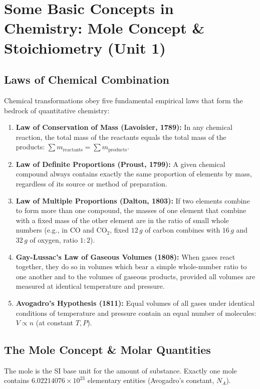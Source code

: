 \documentclass[10pt,a4paper]{article}
\begin{document}
\section{Some Basic Concepts in Chemistry: Mole Concept \& Stoichiometry (Unit 1)}

\subsection{Laws of Chemical Combination}
Chemical transformations obey five fundamental empirical laws that form the bedrock of quantitative chemistry:
\begin{enumerate}
  \item \textbf{Law of Conservation of Mass (Lavoisier, 1789):} In any chemical reaction, the total mass of the reactants equals the total mass of the products: $\sum m_{\text{reactants}} = \sum m_{\text{products}}$.
  \item \textbf{Law of Definite Proportions (Proust, 1799):} A given chemical compound always contains exactly the same proportion of elements by mass, regardless of its source or method of preparation.
  \item \textbf{Law of Multiple Proportions (Dalton, 1803):} If two elements combine to form more than one compound, the masses of one element that combine with a fixed mass of the other element are in the ratio of small whole numbers (e.g., in $\mathrm{CO}$ and $\mathrm{CO_2}$, fixed $12\,\si{g}$ of carbon combines with $16\,\si{g}$ and $32\,\si{g}$ of oxygen, ratio $1:2$).
  \item \textbf{Gay-Lussac's Law of Gaseous Volumes (1808):} When gases react together, they do so in volumes which bear a simple whole-number ratio to one another and to the volumes of gaseous products, provided all volumes are measured at identical temperature and pressure.
  \item \textbf{Avogadro's Hypothesis (1811):} Equal volumes of all gases under identical conditions of temperature and pressure contain an equal number of molecules: $V \propto n$ (at constant $T, P$).
\end{enumerate}

\subsection{The Mole Concept \& Molar Quantities}
The mole is the SI base unit for the amount of substance. Exactly one mole contains $6.02214076 \times 10^{23}$ elementary entities (Avogadro's constant, $N_A$).
\end{document}

